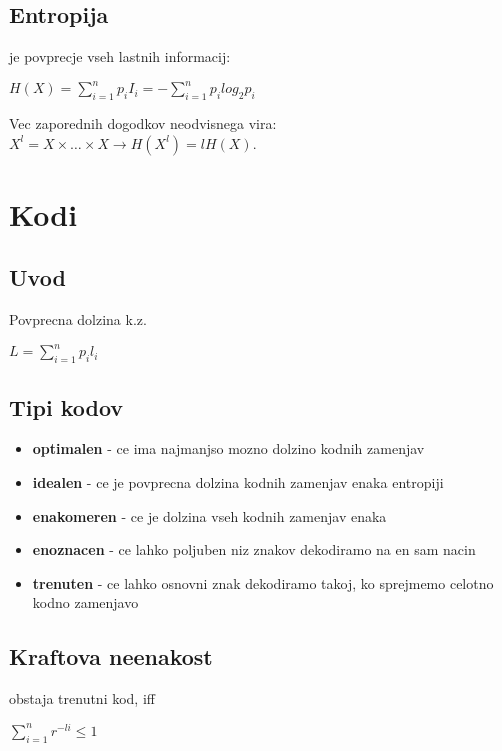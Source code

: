 \documentclass{article}
\begin{document}
\begin{multicols}{4}
	\subsection{Entropija}
	je povprecje vseh lastnih informacij:
	\begin{center}
		\begin{math}
			H(X) = \sum_{i=1}^{n} p_i I_i = -\sum_{i=1}^{n} p_i log_2 p_i
		\end{math}
	\end{center}
	Vec zaporednih dogodkov neodvisnega vira: $X^l = X \times \dots \times X \rightarrow H(X^l) = lH(X)$.

	\section{Kodi}

	\subsection{Uvod}
	Povprecna dolzina k.z.
	\begin{center}
		\begin{math}
			L = \sum_{i=1}^n p_i l_i
		\end{math}
	\end{center}

	\subsection{Tipi kodov}
	\begin{itemize}
		\item \textbf{optimalen} - ce ima najmanjso mozno dolzino kodnih zamenjav
		\item \textbf{idealen} - ce je povprecna dolzina kodnih zamenjav enaka entropiji
		\item \textbf{enakomeren} - ce je dolzina vseh kodnih zamenjav enaka
		\item \textbf{enoznacen} - ce lahko poljuben niz znakov dekodiramo na en sam nacin
		\item \textbf{trenuten} - ce lahko osnovni znak dekodiramo takoj, ko sprejmemo celotno kodno zamenjavo
	\end{itemize}

	\subsection{Kraftova neenakost}
	obstaja trenutni kod, iff
	\begin{center}
		\begin{math}
			\sum_{i=1}^n r^{-li} \leq 1
		\end{math}
	\end{center}


\end{multicols}
\end{document}

